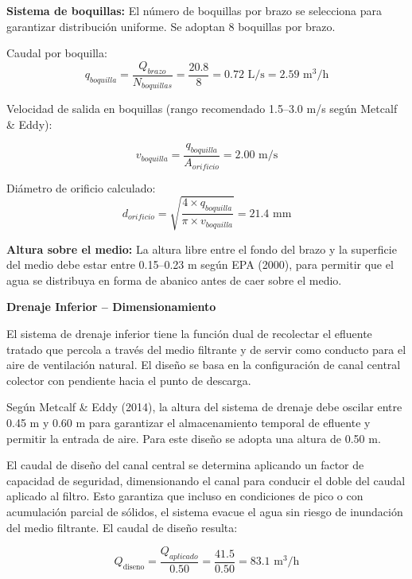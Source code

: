 \documentclass[12pt,a4paper]{article}
\begin{document}
\textbf{Sistema de boquillas:} El número de boquillas por brazo se selecciona para garantizar distribución uniforme. Se adoptan 8 boquillas por brazo.

Caudal por boquilla:
\begin{equation}
q_{boquilla} = \frac{Q_{brazo}}{N_{boquillas}} = \frac{20.8}{8} = 0.72 \text{ L/s} = 2.59 \text{ m}^3\text{/h}
\end{equation}

Velocidad de salida en boquillas (rango recomendado 1.5--3.0 m/s según Metcalf \& Eddy):

\begin{equation}
v_{boquilla} = \frac{q_{boquilla}}{A_{orificio}} = 2.00 \text{ m/s}
\end{equation}

Diámetro de orificio calculado:
\begin{equation}
d_{orificio} = \sqrt{\frac{4 \times q_{boquilla}}{\pi \times v_{boquilla}}} = 21.4 \text{ mm}
\end{equation}

\textbf{Altura sobre el medio:} La altura libre entre el fondo del brazo y la superficie del medio debe estar entre 0.15--0.23 m según EPA (2000), para permitir que el agua se distribuya en forma de abanico antes de caer sobre el medio.

\textbf{Drenaje Inferior -- Dimensionamiento}

El sistema de drenaje inferior tiene la función dual de recolectar el efluente tratado que percola a través del medio filtrante y de servir como conducto para el aire de ventilación natural. El diseño se basa en la configuración de canal central colector con pendiente hacia el punto de descarga.

Según Metcalf \& Eddy (2014), la altura del sistema de drenaje debe oscilar entre 0.45 m y 0.60 m para garantizar el almacenamiento temporal de efluente y permitir la entrada de aire. Para este diseño se adopta una altura de 0.50 m.

El caudal de diseño del canal central se determina aplicando un factor de capacidad de seguridad, dimensionando el canal para conducir el doble del caudal aplicado al filtro. Esto garantiza que incluso en condiciones de pico o con acumulación parcial de sólidos, el sistema evacue el agua sin riesgo de inundación del medio filtrante. El caudal de diseño resulta:

\begin{equation}
Q_{\text{diseno}} = \frac{Q_{aplicado}}{0.50} = \frac{41.5}{0.50} = 83.1 \text{ m}^3\text{/h}
\end{equation}
\end{document}
